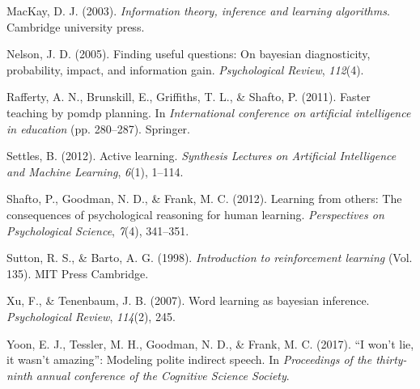 \documentclass[10pt, letterpaper]{article}
\begin{document}
\hypertarget{ref-mackay2003}{}
MacKay, D. J. (2003). \emph{Information theory, inference and learning
algorithms}. Cambridge university press.

\hypertarget{ref-nelson2005}{}
Nelson, J. D. (2005). Finding useful questions: On bayesian
diagnosticity, probability, impact, and information gain.
\emph{Psychological Review}, \emph{112}(4).

\hypertarget{ref-rafferty2011faster}{}
Rafferty, A. N., Brunskill, E., Griffiths, T. L., \& Shafto, P. (2011).
Faster teaching by pomdp planning. In \emph{International conference on
artificial intelligence in education} (pp. 280--287). Springer.

\hypertarget{ref-settles2012active}{}
Settles, B. (2012). Active learning. \emph{Synthesis Lectures on
Artificial Intelligence and Machine Learning}, \emph{6}(1), 1--114.

\hypertarget{ref-shafto2012learning}{}
Shafto, P., Goodman, N. D., \& Frank, M. C. (2012). Learning from
others: The consequences of psychological reasoning for human learning.
\emph{Perspectives on Psychological Science}, \emph{7}(4), 341--351.

\hypertarget{ref-sutton1998}{}
Sutton, R. S., \& Barto, A. G. (1998). \emph{Introduction to
reinforcement learning} (Vol. 135). MIT Press Cambridge.

\hypertarget{ref-xu2007}{}
Xu, F., \& Tenenbaum, J. B. (2007). Word learning as bayesian inference.
\emph{Psychological Review}, \emph{114}(2), 245.

\hypertarget{ref-yoon2017}{}
Yoon, E. J., Tessler, M. H., Goodman, N. D., \& Frank, M. C. (2017). ``I
won't lie, it wasn't amazing'': Modeling polite indirect speech. In
\emph{Proceedings of the thirty-ninth annual conference of the Cognitive
Science Society}.
\end{document}
